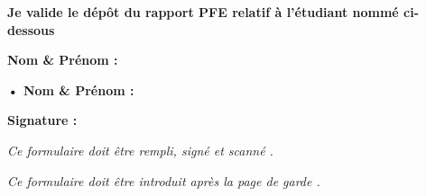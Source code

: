\thispagestyle{empty}


\noindent \textbf{Je valide le dépôt du rapport PFE relatif à l’étudiant nommé ci-dessous}

\vspace{1cm}

\noindent \textbf{Nom \& Prénom :} \dotfill

\vspace{1.5cm}



\begin{tcolorbox}[colback=black!5!white, colframe=black, title=\textbf{Encadrant Académique}, width=\textwidth, boxrule=0.5pt]
\textbf{• Nom \& Prénom :} \dotfill

\vspace{1cm}

\textbf{Signature :}

\vspace{2.5cm}
\end{tcolorbox}

\vspace{1.5cm}

\noindent \textit{Ce formulaire doit être rempli, signé et scanné .}

\vspace{0.3cm}

\noindent \textit{Ce formulaire doit être introduit après la page de garde .}

\vfill
